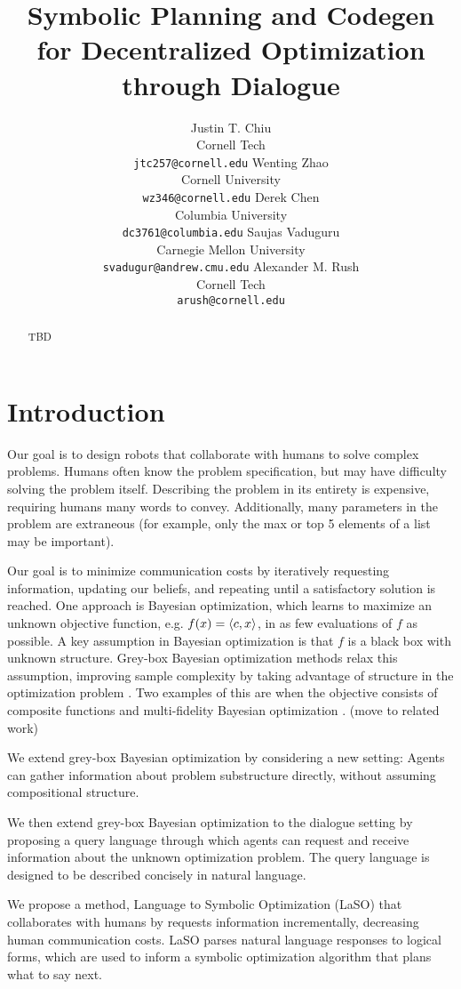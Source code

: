 \documentclass[11pt]{article}
\title{
Symbolic Planning and Codegen\\
for Decentralized Optimization through Dialogue
}
\author{
Justin T. Chiu  \\
Cornell Tech \\
\texttt{jtc257@cornell.edu}
\And
Wenting Zhao \\
Cornell University \\
\texttt{wz346@cornell.edu}
\And
Derek Chen \\
Columbia University \\
\texttt{dc3761@columbia.edu}
\AND
Saujas Vaduguru \\
Carnegie Mellon University \\
\texttt{svadugur@andrew.cmu.edu}
\And
Alexander M. Rush \\
Cornell Tech \\
\texttt{arush@cornell.edu}
}
\begin{document}
\maketitle

\begin{abstract}
TBD
\end{abstract}

\section{Introduction}
Our goal is to design robots that collaborate with humans to solve complex problems.
Humans often know the problem specification, but may have difficulty solving the problem itself.
Describing the problem in its entirety is expensive, requiring humans many words to convey.
Additionally, many parameters in the problem are extraneous (for example, only the max or top 5 elements of a list may be important).

Our goal is to minimize communication costs by iteratively requesting information, updating our beliefs, and repeating until a satisfactory solution is reached.
One approach is Bayesian optimization, which learns to maximize an unknown objective function,
e.g. $f(x) = \left\langle c,x\right\rangle$, in as few evaluations of $f$ as possible.
A key assumption in Bayesian optimization is that $f$ is a black box with unknown structure.
Grey-box Bayesian optimization methods relax this assumption, improving sample complexity by taking advantage of structure in the optimization problem \citep{grey-box-bayesopt}.
Two examples of this are when the objective consists of composite functions \citep{astudillo2019bayesian} and multi-fidelity Bayesian optimization \citep{poloczek2016multiinformation,Zanjani_Foumani_2023}. (move to related work)

We extend grey-box Bayesian optimization by considering a new setting:
Agents can gather information about problem substructure directly, without assuming compositional structure.

We then extend grey-box Bayesian optimization to the dialogue setting by proposing a query language through which agents can request and receive information about the unknown optimization problem.
The query language is designed to be described concisely in natural language.

We propose a method, Language to Symbolic Optimization (LaSO) that collaborates with humans by requests information incrementally, decreasing human communication costs.
LaSO parses natural language responses to logical forms, which are used to inform a symbolic optimization algorithm that plans what to say next.
\end{document}
